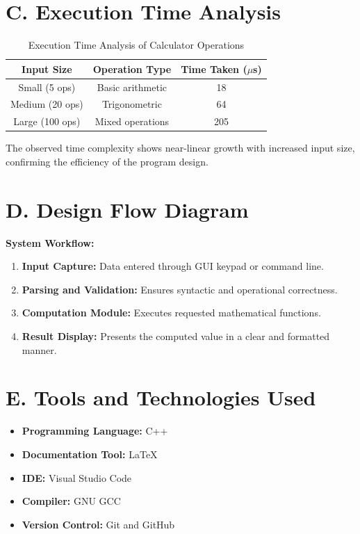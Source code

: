 \documentclass[a4paper,12pt,oneside]{report}
\numberwithin{equation}{chapter}
\numberwithin{figure}{chapter}
\numberwithin{table}{chapter}
\begin{document}
\section*{C. Execution Time Analysis}

\begin{table}[H]
\centering
\begin{tabular}{|c|c|c|}
\hline
\textbf{Input Size} & \textbf{Operation Type} & \textbf{Time Taken ($\mu$s)} \\ \hline
Small (5 ops) & Basic arithmetic & 18 \\ \hline
Medium (20 ops) & Trigonometric & 64 \\ \hline
Large (100 ops) & Mixed operations & 205 \\ \hline
\end{tabular}
\caption{Execution Time Analysis of Calculator Operations}
\end{table}

The observed time complexity shows near-linear growth with increased input size, confirming the efficiency of the program design.

\section*{D. Design Flow Diagram}

\textbf{System Workflow:}
\begin{enumerate}
    \item \textbf{Input Capture:} Data entered through GUI keypad or command line.
    \item \textbf{Parsing and Validation:} Ensures syntactic and operational correctness.
    \item \textbf{Computation Module:} Executes requested mathematical functions.
    \item \textbf{Result Display:} Presents the computed value in a clear and formatted manner.
\end{enumerate}

\section*{E. Tools and Technologies Used}
\begin{itemize}
    \item \textbf{Programming Language:} C++
    \item \textbf{Documentation Tool:} LaTeX
    \item \textbf{IDE:} Visual Studio Code
    \item \textbf{Compiler:} GNU GCC
    \item \textbf{Version Control:} Git and GitHub
\end{itemize}
\end{document}

